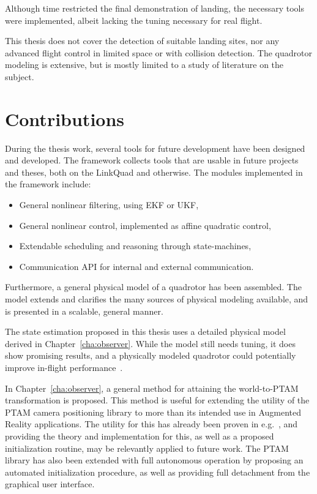     Although time restricted the final demonstration of landing, the necessary tools
    were implemented, albeit lacking the tuning necessary for real flight.

    This thesis does not cover the detection of suitable landing sites,
    nor any advanced flight control in limited space or with collision detection.
    The quadrotor modeling is extensive, but is mostly limited to a study
    of literature on the subject.

\section{Contributions}
    During the thesis work, several tools for future development have been
    designed and developed. The \crap framework collects tools that are usable in future
    projects and theses, both on the LinkQuad and otherwise.
    The modules implemented in the \crap framework include:
    \begin{itemize}
        \item General nonlinear filtering, using EKF or UKF,
        \item General nonlinear control, implemented as affine quadratic control,
        \item Extendable scheduling and reasoning through state-machines,
        \item Communication API for internal and external communication.
    \end{itemize}

    Furthermore, a general physical model of a quadrotor has been assembled.
    The model extends and clarifies the many sources of physical modeling
    available, and is presented in a scalable, general manner.

    The state estimation proposed in this thesis uses a detailed physical model
    derived in Chapter~\ref{cha:observer}. While the model still needs
    tuning, it does show promising results, and a physically modeled
    quadrotor could potentially improve in-flight performance~\citep{bouabdallah07full}.

    In Chapter~\ref{cha:observer}, a general method for attaining
    the world-to-PTAM transformation is proposed.
    This method is useful for extending the utility of the PTAM
    camera positioning library to more than its intended use in Augmented Reality applications.
    The utility for this has already been proven in e.g.~\citep{weiss11monocular},
    and providing the theory and implementation for this, as well as a proposed
    initialization routine, may be relevantly applied to future work.
    The PTAM library has also been extended with full autonomous operation by
    proposing an automated initialization procedure, as well as providing
    full detachment from the graphical user interface.


